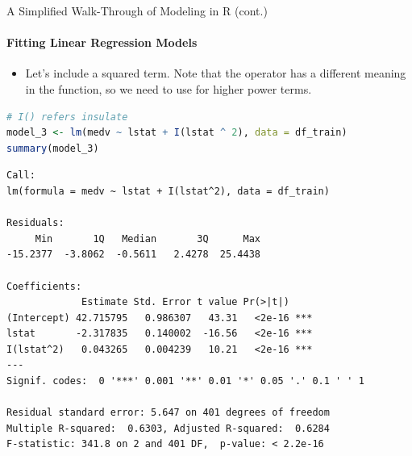 \begin{frame}[fragile]{A Simplified Walk-Through of Modeling in R (cont.)}
\framesubtitle{Fitting Linear Regression Models}
\begin{itemize}
  \item Let’s include a squared term. Note that the  operator has a different meaning in the  function, so we need to use  for higher power terms.
\end{itemize}
\begin{lstlisting}[language=R]
# I() refers insulate
model_3 <- lm(medv ~ lstat + I(lstat ^ 2), data = df_train)
summary(model_3)
\end{lstlisting}
\begin{lstlisting}[style=output,basicstyle=\ttfamily\tiny\color{black!75}]
Call:
lm(formula = medv ~ lstat + I(lstat^2), data = df_train)

Residuals:
     Min       1Q   Median       3Q      Max 
-15.2377  -3.8062  -0.5611   2.4278  25.4438 

Coefficients:
             Estimate Std. Error t value Pr(>|t|)    
(Intercept) 42.715795   0.986307   43.31   <2e-16 ***
lstat       -2.317835   0.140002  -16.56   <2e-16 ***
I(lstat^2)   0.043265   0.004239   10.21   <2e-16 ***
---
Signif. codes:  0 '***' 0.001 '**' 0.01 '*' 0.05 '.' 0.1 ' ' 1

Residual standard error: 5.647 on 401 degrees of freedom
Multiple R-squared:  0.6303, Adjusted R-squared:  0.6284 
F-statistic: 341.8 on 2 and 401 DF,  p-value: < 2.2e-16
\end{lstlisting}
\end{frame}

